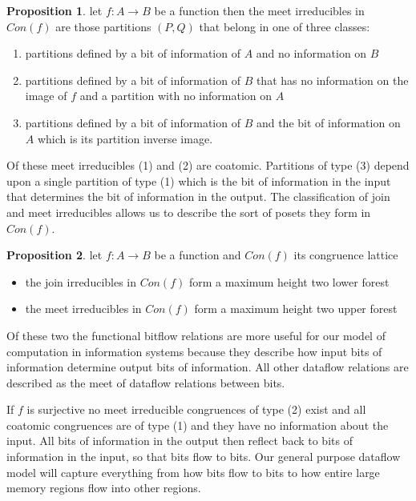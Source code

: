 \documentclass[a4paper,11pt, notitlepage]{report}
\theoremstyle{definition}
\newtheorem{proposition}{Proposition}[section]
\begin{document}
\begin{proposition}
let $f: A \to B$ be a function then the meet irreducibles in $Con(f)$ are those partitions $(P,Q)$ that belong in one of three classes:

\begin{enumerate}
 \item partitions defined by a bit of information of $A$ and no information on $B$
 \item partitions defined by a bit of information of $B$ that has no information on the image of $f$ and a partition with no information on $A$
 \item partitions defined by a bit of information of $B$ and the bit of information on $A$ which is its partition inverse image.
\end{enumerate}
\end{proposition}

Of these meet irreducibles (1) and (2) are coatomic. Partitions of type (3) depend upon a single partition of type (1) which is the bit of information in the input that determines the bit of information in the output. The classification of join and meet irreducibles allows us to describe the sort of posets they form in $Con(f)$.

\begin{proposition}
let $f: A \to B$ be a function and $Con(f)$ its congruence lattice
\begin{itemize}
 \item the join irreducibles in $Con(f)$ form a maximum height two lower forest
 \item the meet irreducibles in $Con(f)$ form a maximum height two upper forest
\end{itemize}
\end{proposition}

Of these two the functional bitflow relations are more useful for our model of computation in information systems because they describe how input bits of information determine output bits of information. All other dataflow relations are described as the meet of dataflow relations between bits.

If $f$ is surjective no meet irreducible congruences of type (2) exist and all coatomic congruences are of type (1) and they have no information about the input. All bits of information in the output then reflect back to bits of information in the input, so that bits flow to bits. Our general purpose dataflow model will capture everything from how bits flow to bits to how entire large memory regions flow into other regions.
\end{document}
